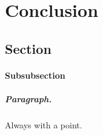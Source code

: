 \chapter{Conclusion}
\label{chap:conclusion}
\section{Section}
%
\subsubsection{Subsubsection}

\paragraph{Paragraph.} Always with a point.

